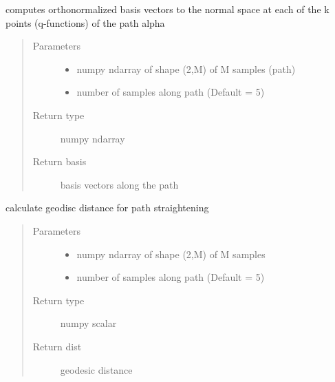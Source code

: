 \documentclass[letterpaper,10pt,english]{sphinxmanual}
\begin{document}
\begin{fulllineitems}
\label{\detokenize{geodesic:geodesic.find_basis_normal_path}}
computes orthonormalized basis vectors to the normal space at each of the
k points (q-functions) of the path alpha
\begin{quote}\begin{description}
\item[{Parameters}] \leavevmode\begin{itemize}
\item {} 
 \textendash{} numpy ndarray of shape (2,M) of M samples (path)

\item {} 
 \textendash{} number of samples along path (Default = 5)

\end{itemize}

\item[{Return type}] \leavevmode
numpy ndarray

\item[{Return basis}] \leavevmode
basis vectors along the path

\end{description}\end{quote}

\end{fulllineitems}


\begin{fulllineitems}
\label{\detokenize{geodesic:geodesic.geod_dist_path_strt}}
calculate geodisc distance for path straightening
\begin{quote}\begin{description}
\item[{Parameters}] \leavevmode\begin{itemize}
\item {} 
 \textendash{} numpy ndarray of shape (2,M) of M samples

\item {} 
 \textendash{} number of samples along path (Default = 5)

\end{itemize}

\item[{Return type}] \leavevmode
numpy scalar

\item[{Return dist}] \leavevmode
geodesic distance

\end{description}\end{quote}

\end{fulllineitems}
\end{document}

